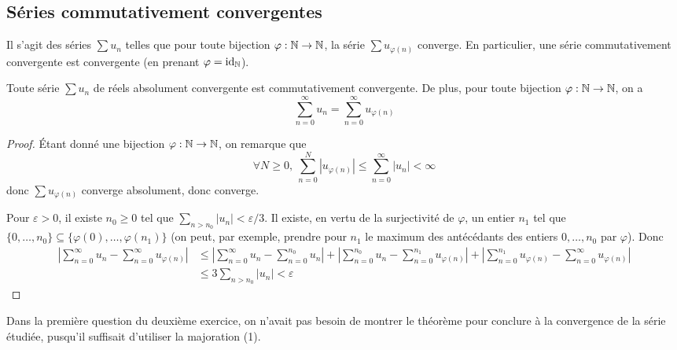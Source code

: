 \documentclass[10pt]{scrartcl}
\title{}
\author{}
\date{}
\begin{document}
    \subsection*{Séries commutativement convergentes}
    Il s'agit des séries $\sum u_n$ telles que pour toute bijection $\varphi:\operatorname{\mathbb N}\to\operatorname{\mathbb N}$, la série $\sum u_{\varphi(n)}$ converge. 
    En particulier, une série commutativement convergente est convergente (en prenant $\varphi=\operatorname{id}_{\operatorname{\mathbb N}}$).
    \begin{thm}
        Toute série $\sum u_n$ de réels absolument convergente est commutativement convergente. 
        De plus, pour toute bijection $\varphi:\operatorname{\mathbb N}\to\operatorname{\mathbb N}$, on a 
        \[
            \sum_{n=0}^\infty u_n=\sum_{n=0}^\infty u_{\varphi(n)}
        \]
    \end{thm}

    \begin{proof}
        Étant donné une bijection $\varphi:\operatorname{\mathbb N}\to\operatorname{\mathbb N}$, on remarque que 
        \[
            \forall N\geq 0,\ \sum_{n=0}^N|u_{\varphi(n)}|\leq \sum_{n=0}^\infty|u_n|<\infty\tag*{(1)}
        \]
        donc $\sum u_{\varphi(n)}$ converge absolument, donc converge. 
        
        Pour $\varepsilon > 0$, il existe $n_0\geq 0$ tel que $\sum_{n> n_0}|u_n|<\varepsilon/3$. 
        Il existe, en vertu de la surjectivité de $\varphi$, un entier $n_1$ tel que $\lbrace 0,\dots,n_0\rbrace\subseteq\lbrace\varphi(0),\dots,\varphi(n_1)\rbrace$ (on peut, par exemple, prendre pour $n_1$ le maximum des antécédants des entiers $0,\dots,n_0$ par $\varphi$).
        Donc 
        \begin{align*}
            \left|\sum_{n=0}^\infty u_n-\sum_{n=0}^\infty u_{\varphi(n)}\right| &\leq \left|\sum_{n=0}^\infty u_n-\sum_{n=0}^{n_0} u_n\right|+\left|\sum_{n=0}^{n_0} u_n-\sum_{n=0}^{n_1} u_{\varphi(n)}\right|+\left|\sum_{n=0}^{n_1} u_{\varphi(n)}-\sum_{n=0}^\infty u_{\varphi(n)}\right|\\
                                                                                &\leq 3\sum_{n>n_0}|u_n|<\varepsilon
        \end{align*}
    \end{proof}

    \begin{remarks}
        Dans la première question du deuxième exercice, on n'avait pas besoin de montrer le théorème pour conclure à la convergence de la série étudiée, pusqu'il suffisait d'utiliser la majoration (1).
    \end{remarks}
\end{document}

